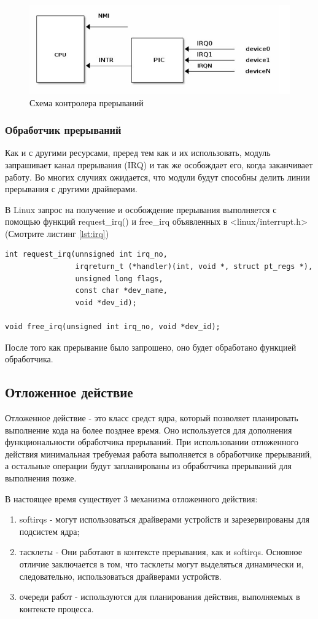 \begin{figure}[H]
	\centering
	\includegraphics[width=0.7\linewidth]{"src/img/interupt device"}
	\caption{Схема контролера прерываний}
	\label{fig:interupt-device}
\end{figure}

\subsubsection{Обработчик прерываний}
Как и с другими ресурсами, преред тем как и их использовать, модуль запрашивает канал прерывания (IRQ) и так же особождает его, когда заканчивает работу.
Во многих случиях ожидается, что модули будут способны делить линии прерывания с другими драйверами.

В Linux запрос на получение и особождение прерывания выполняется с помощью функций request\_irq() и free\_irq объявленных в <linux/interrupt.h> (Смотрите листинг \ref{lst:irq})
\begin{lstlisting}[caption={Функция request\_irq() и free\_irq()}, label={lst:irq}]
int request_irq(unnsigned int irq_no,
				irqreturn_t (*handler)(int, void *, struct pt_regs *),
				unsigned long flags,
				const char *dev_name,
				void *dev_id);

void free_irq(unsigned int irq_no, void *dev_id);
\end{lstlisting}

После того как прерывание было запрошено, оно будет обработано функцией обработчика.

\subsection{Отложенное действие}
Отложенное действие - это класс средст ядра, который позволяет планировать выполнение кода на более позднее время.
Оно используется для дополнения функциональности обработчика прерываний.
При использовании отложенного действия минимальная требуемая работа выполняется в обработчике прерываний, а остальные операции будут запланированы из обработчика прерываний для выполнения позже. 

В настоящее время существует 3 механизма отложенного действия:
\begin{enumerate}
	\item softirqs - могут использоваться драйверами устройств и зарезервированы для подсистем ядра;
	\item тасклеты - Они работают в контексте прерывания, как и softirqs.
	Основное отличие заключается в том, что тасклеты могут выделяться динамически и, следовательно, использоваться драйверами устройств.
	\item очереди работ - используются для планирования действия, выполняемых в контексте процесса.
\end{enumerate}

